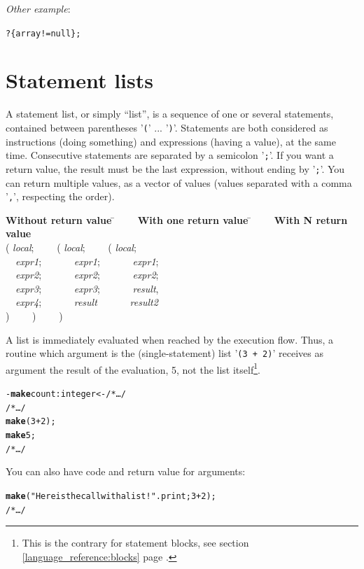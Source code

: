 \documentclass[11pt]{mybook}
\begin{document}
{\it{}Other example}:
\begin{alltt} 
      ? \{array != {\sc{}null}\};
\end{alltt}

\section{Statement lists}
\label{language_reference:lists}
%
A statement list, or simply ``list'', is a sequence of one or several
statements, contained  between parentheses '{\tt (}' ... '{\tt )}'. 
Statements are both considered as instructions (doing something) and
expressions (having a value), at the same time.
Consecutive statements are separated by a semicolon '{\tt ;}'.
If you want a return value, the result must be the last expression, without ending by '{\tt ;}'.
You can return multiple values, as a vector of values (values separated with a comma '{\tt ,}', respecting the order).
\begin{tabbing}
{\bf{}Without return value} \= ~~~~{\bf{}With one return value} \= ~~~~{\bf{}With N return value}\\
( {\it{}local};             \> ~~~~( {\it{}local};              \> ~~~~( {\it{}local};\\
~~{\it{}expr1};             \> ~~~~~~{\it{}expr1};              \> ~~~~~~{\it{}expr1};\\
~~{\it{}expr2};             \> ~~~~~~{\it{}expr2};              \> ~~~~~~{\it{}expr2};\\
~~{\it{}expr3};             \> ~~~~~~{\it{}expr3};              \> ~~~~~~{\it{}result},\\
~~{\it{}expr4};             \> ~~~~~~{\it{}result}              \> ~~~~~~{\it{}result2}\\
)                           \> ~~~~)                            \> ~~~~)
\end{tabbing}

A list is immediately evaluated when reached by the execution flow.
Thus, a routine which argument is the (single-statement) list '{\tt (3
+ 2)}' receives as argument the result of the evaluation, 5, not the
list itself\footnote{This is the contrary for statement blocks, see 
section \ref{language_reference:blocks} page \pageref{language_reference:blocks}.}. 
\begin{alltt}
    - {\bf{}make} count:{\sc{}integer} <- /* \ldots */
    /* \ldots */
    {\bf{}make} (3 + 2);
    {\bf{}make} 5;
    /* \ldots */
\end{alltt}
You can also have code and return value for arguments:
\begin{alltt}
    {\bf{}make} ("Here is the call with a list !".print; 3 + 2);
    /* \ldots */
\end{alltt}
\end{document}
